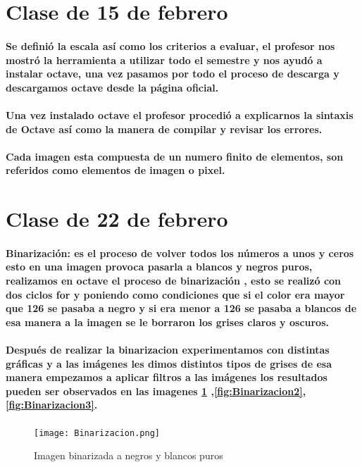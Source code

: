 \documentclass[10pt,a4paper]{article}
\begin{document}
\printindex

\tableofcontents %

\cleardoublepage
{} %
\listoffigures %

\cleardoublepage

\section{Clase de 15 de febrero
}

\paragraph{
Se defini\'o la escala as\'i como los criterios a evaluar, el profesor nos mostr\'o la herramienta a utilizar todo el semestre y nos ayud\'o a instalar octave, una vez pasamos por todo el proceso de descarga y descargamos octave desde la p\'agina oficial.
}
\paragraph{
Una vez instalado octave el profesor procedi\'o a explicarnos la sintaxis de Octave as\'i como la manera de compilar y revisar los errores.
}

\paragraph{Cada imagen esta compuesta de un numero finito de elementos, son referidos como elementos de imagen o pixel.}

\section{
Clase de 22 de febrero
}
\paragraph{
Binarizaci\'on: es el proceso de volver todos los n\'umeros a unos y ceros esto en una imagen provoca pasarla a blancos y negros puros, realizamos en octave el proceso de binarizaci\'on , esto se realiz\'o con dos ciclos for y poniendo como condiciones que si el color era mayor que 126 se pasaba a negro y si era menor a 126 se pasaba a blancos de esa manera a la imagen se le borraron los grises claros y oscuros.
}

\paragraph{
Despu\'es de realizar la binarizacion experimentamos con distintas gr\'aficas y a las im\'agenes les dimos distintos tipos de grises de esa manera empezamos a aplicar filtros a las im\'agenes los resultados pueden ser observados en las imagenes \ref{fig:Binarizacion} ,\ref{fig:Binarizacion2},\ref{fig:Binarizacion3}.
}
\begin{figure}[h]
\texttt{[image: Binarizacion.png]}
\caption{Imagen binarizada a negros y blancos puros}
\label{fig:Binarizacion}
\end{figure}
\end{document}
